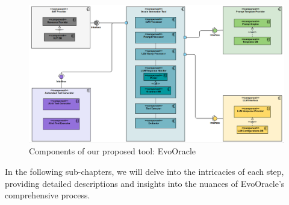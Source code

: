 \begin{figure}
\centering
\includegraphics[width=1\textwidth]{images/UML_Component_Diagram_EvoOracle_v2.png}
\caption{Components of our proposed tool: EvoOracle}
\label{fig:component_diagram}
\end{figure}

In the following sub-chapters, we will delve into the intricacies of each step, providing detailed descriptions and insights into the nuances of EvoOracle's comprehensive process.

